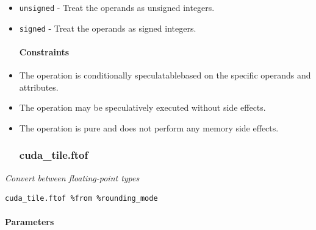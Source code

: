 \documentclass{article}
\begin{document}
\begin{itemize}
\item \texttt{unsigned} - Treat the operands as unsigned integers.
\item \texttt{signed} - Treat the operands as signed integers.


\paragraph{Constraints}

\item The operation is conditionally speculatablebased on the specific operands and attributes.
\item The operation may be speculatively executed without side effects.
\item The operation is pure and does not perform any memory side effects.


\subsubsection{cuda\_tile.ftof}

\end{itemize}
\textit{Convert between floating-point types}


\begin{lstlisting}
cuda_tile.ftof %from %rounding_mode
\end{lstlisting}

\paragraph{Parameters}
\end{document}
